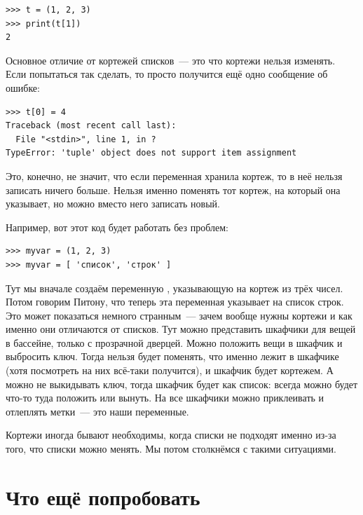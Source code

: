 \begin{listing}
\begin{verbatim}
>>> t = (1, 2, 3)
>>> print(t[1])
2
\end{verbatim}
\end{listing}

Основное отличие от кортежей списков — это что кортежи нельзя изменять. Если попытаться так сделать, то просто получится ещё одно сообщение об ошибке:

\begin{listing}
\begin{verbatim}
>>> t[0] = 4
Traceback (most recent call last):
  File "<stdin>", line 1, in ?
TypeError: 'tuple' object does not support item assignment
\end{verbatim}
\end{listing}

Это, конечно, не значит, что если переменная хранила кортеж, то в неё нельзя записать ничего больше. Нельзя именно поменять тот кортеж, на который она указывает, но можно вместо него записать новый.

Например, вот этот код будет работать без проблем:

\begin{listing}
\begin{verbatim}
>>> myvar = (1, 2, 3)
>>> myvar = [ 'список', 'строк' ]
\end{verbatim}
\end{listing}

Тут мы вначале создаём переменную , указывающую на кортеж из трёх чисел. Потом говорим Питону, что теперь эта переменная указывает на список строк. Это может показаться немного странным — зачем вообще нужны кортежи и как именно они отличаются от списков. Тут можно представить шкафчики для вещей в бассейне, только с прозрачной дверцей. Можно положить вещи в шкафчик и выбросить ключ. Тогда нельзя будет поменять, что именно лежит в шкафчике (хотя посмотреть на них всё-таки получится), и шкафчик будет кортежем. А можно не выкидывать ключ, тогда шкафчик будет как список: всегда можно будет что-то туда положить или вынуть. На все шкафчики можно приклеивать и отлеплять метки — это наши переменные.

Кортежи иногда бывают необходимы, когда списки не подходят именно из-за того, что списки можно менять. Мы потом столкнёмся с такими ситуациями.

\section{Что ещё попробовать}

